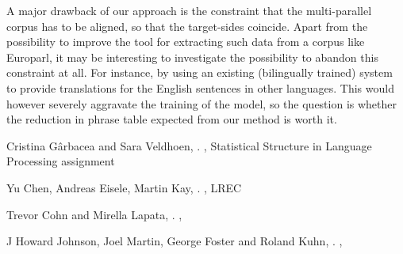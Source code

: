 \documentclass[11pt]{article}
\begin{document}
A major drawback of our approach is the constraint that the multi-parallel corpus has to be aligned, so that the target-sides coincide. Apart from the possibility to improve the tool for extracting such data from a corpus like Europarl, it may be interesting to investigate the possibility to abandon this constraint at all. For instance, by using an existing (bilingually trained) system to provide translations for the English sentences in other languages. This would however severely aggravate the training of the model, so the question is whether the reduction in phrase table expected from our method is worth it.


\begin{thebibliography}{}

{Cristina G{\^a}rbacea and Sara Veldhoen},
.
,
\newblock Statistical Structure in Language Processing assignment

{Yu Chen, Andreas Eisele, Martin Kay},
.
,
\newblock LREC

{Trevor Cohn and Mirella Lapata},
.
,

{J Howard Johnson, Joel Martin, George Foster and Roland Kuhn},
.
,


\end{thebibliography}
\end{document}
